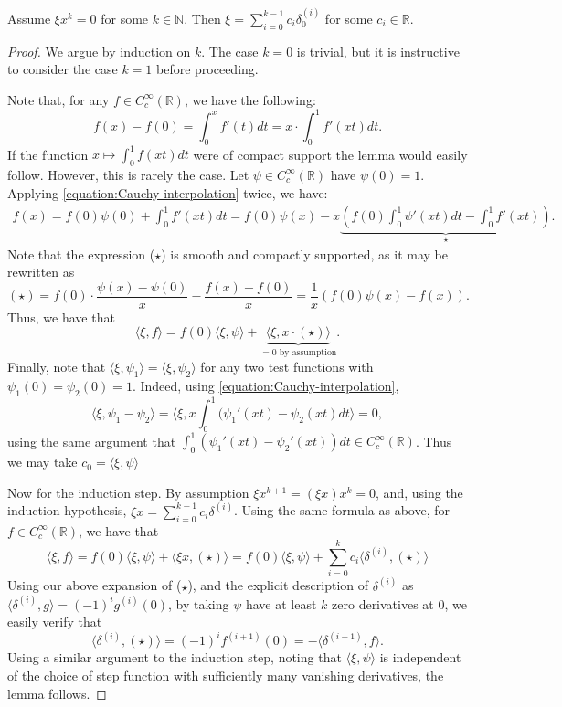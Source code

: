 \documentclass[12pt, draft,reqno,a4paper, twoside]{amsproc}
\newcommand{\dbN}{\mathbb N}
\newcommand{\dbR}{\mathbb R}
\newcommand{\gen}[1]{\langle{#1}\rangle}
\begin{document}
\begin{lem}Assume $\xi x^k=0$ for some $k\in\dbN$. Then $\xi=\sum_{i=0}^{k-1}c_i\delta_0^{(i)}$ for some $c_i\in \dbR$. 
\end{lem}
\begin{proof}
We argue by induction on $k$. The case $k=0$ is trivial, but it is instructive to consider the case $k=1$ before proceeding.

Note that, for any $f\in C_c^\infty(\dbR)$, we have the following:
\begin{equation}
\label{equation:Cauchy-interpolation}
f(x)-f(0)=\int_0^x f'(t)dt=x\cdot\int_0^1 f'(xt)dt.
\end{equation}
If the function $x\mapsto\int_0^1 f(xt)dt$ were of compact support the lemma would easily follow. However, this is rarely the case. Let $\psi\in C_c^\infty(\dbR)$ have $\psi(0)=1$. Applying \eqref{equation:Cauchy-interpolation} twice, we have:
\begin{multline*}
f(x)=f(0)\psi(0)+\int_0^1 f'(xt)dt=f(0)\psi(x)-x\underbrace{\left(f(0)\int_{0}^1 \psi'(xt)dt-\int_0^1f'(xt)\right)}_{\star}.
\end{multline*}
Note that the expression ($\star$) is smooth and compactly supported, as it may be rewritten as
\[(\star)=f(0)\cdot\frac{\psi(x)-\psi(0)}{x}-\frac{f(x)-f(0)}{x}=\frac{1}{x}\left(f(0)\psi(x)-f(x)\right).\]
Thus, we have that
\[\gen{\xi,f}=f(0)\gen{\xi,\psi}+\underbrace{\gen{\xi,x\cdot(\star)}}_{=0\text{ by assumption}}.\]
Finally, note that $\gen{\xi,\psi_1}=\gen{\xi,\psi_2}$ for any two test functions with $\psi_1(0)=\psi_2(0)=1$. Indeed, using \eqref{equation:Cauchy-interpolation},
\[\gen{\xi,\psi_1-\psi_2}=\gen{\xi,x\int_0^1(\psi_1'(xt)-\psi_2(xt)dt}=0,\]
using the same argument that $\int_0^1(\psi_1'(xt)-\psi_2'(xt))dt\in C_c^\infty(\dbR)$. Thus we may take $c_0=\gen{\xi,\psi}$

Now for the induction step. By assumption $\xi x^{k+1}=(\xi x)x^{k}=0$, and, using the induction hypothesis, $\xi x=\sum_{i=0}^{k-1} c_i\delta^{(i)}$. Using the same formula as above, for $f\in C_c^\infty(\dbR)$, we have that
\[\gen{\xi, f}=f(0)\gen{\xi,\psi}+\gen{\xi x,(\star)}=f(0)\gen{\xi,\psi}+\sum_{i=0}^k c_i\gen{\delta^{(i)},(\star)}\]
Using our above expansion of ($\star$), and the explicit description of $\delta^{(i)}$ as $\gen{\delta^{(i)},g}=(-1)^i g^{(i)}(0)$, by taking $\psi$ have at least $k$ zero derivatives at $0$, we easily verify that 
\[\gen{\delta^{(i)},(\star)}=(-1)^{i}f^{(i+1)}(0)=-\gen{\delta^{(i+1)},f}.\]
Using a similar argument to the induction step, noting that $\gen{\xi,\psi}$ is independent of the choice of step function with sufficiently many vanishing derivatives, the lemma follows.
\end{proof}
\end{document}
